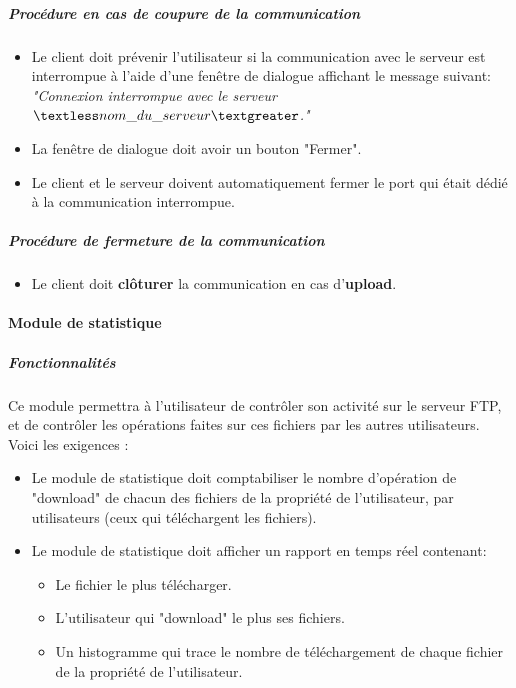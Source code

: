 \documentclass[10pt,a4paper]{report}
\begin{document}
	\subparagraph{Procédure en cas de coupure de la communication}

		\begin{itemize}[label = $\triangleright$]
			\item Le client doit prévenir l'utilisateur si la communication avec le serveur est interrompue à l'aide d'une fenêtre de dialogue affichant le message suivant:\\
\textit{"Connexion interrompue avec le serveur $\textless nom\_du\_serveur\textgreater$."}

			\item La fenêtre de dialogue doit avoir un bouton "Fermer".

			\item Le client et le serveur doivent automatiquement fermer le port qui était dédié à la communication interrompue.
		\end{itemize}
		
	\subparagraph{Procédure de fermeture de la communication}

		\begin{itemize}[label = $\triangleright$]
			\item Le client doit \textbf{clôturer} la communication en cas d'\textbf{upload}. 
		\end{itemize}
		
\paragraph{Module de statistique}

	\subparagraph{Fonctionnalités}

	Ce module permettra à l'utilisateur de contrôler son activité sur le serveur FTP, et de contrôler les opérations faites sur ces fichiers par les autres utilisateurs.\\

	Voici les exigences :
		\begin{itemize}[label = $\triangleright$]

			\item Le module de statistique doit comptabiliser le nombre d'opération de "download" de chacun des fichiers de la propriété de l'utilisateur, par utilisateurs (ceux qui téléchargent les fichiers).

			\item Le module de statistique doit afficher un rapport en temps réel contenant: 

			\begin{itemize}
				\item Le fichier le plus télécharger.

				\item L'utilisateur qui "download" le plus ses fichiers.

				\item Un histogramme qui trace le nombre de téléchargement de chaque fichier de la propriété de l'utilisateur.
			\end{itemize} 
		\end{itemize}
\end{document}
